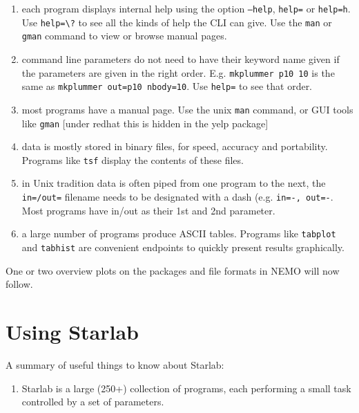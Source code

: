 \begin{itemize}
\begin{itemize}
\begin{enumerate}
\item
each program displays internal help using the option 
{\tt --help}, {\tt help=} or {\tt help=h}. Use \verb+help=\?+ to see
all the kinds of help the CLI can give. Use
the {\tt man} or {\tt gman} command to view or browse manual pages.

\item
command line parameters do not need to have their keyword name given
if the parameters are given in the right order. 
E.g. {\tt mkplummer p10 10} is the same as 
{\tt mkplummer out=p10 nbody=10}. Use {\tt help=} to see that order.

\item
most programs have a manual page. Use the unix {\tt man} command, or
GUI tools like {\tt gman}  [under redhat this is hidden in the yelp package]

\item
data is mostly stored in binary files, for speed, accuracy and portability.
Programs like {\tt tsf} display the contents of these files.

\item
in  Unix tradition data is often piped from one program to the next, the
{\tt in=/out=} filename  needs to be designated with a dash 
(e.g. {\tt in=-, out=-}.   Most programs have in/out as their 1st and 
2nd parameter.

\item
a large number of programs produce ASCII tables. Programs like
{\tt tabplot} and {\tt tabhist} are convenient endpoints to
quickly present results graphically.

\end{enumerate}

One or two overview plots on the packages and file formats in NEMO will now follow.


\chapter                {Using Starlab}

A summary of useful things to know about Starlab:


\begin{enumerate}

\item
Starlab is a large (250+) collection of programs, each performing a small task
controlled by a set of parameters.


\end{enumerate}
\end{itemize}
\end{itemize}
